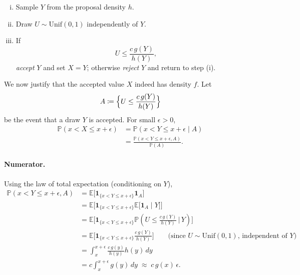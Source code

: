 \documentclass{tufte-handout}
\newcommand*\E{\mathbb{E}}
\renewcommand{\P}{\mathbb{P}}
\theoremstyle{definition}
\begin{document}
\begin{enumerate}[(i)]
	\item Sample $Y$ from the proposal density $h$.
	\item Draw $U \sim \mathrm{Unif}(0,1)$ independently of $Y$.
	\item If 
	      \[
	      	U \le \frac{c\,g(Y)}{h(Y)},
	      \]
	      \emph{accept} $Y$ and set $X = Y$; otherwise \emph{reject} $Y$
	      and return to step (i).
\end{enumerate}

We now justify that the accepted value $X$ indeed has density $f$.  Let
\[
	A \coloneqq \Bigl\{ U \le \frac{c\,g(Y)}{h(Y)} \Bigr\}
\]
be the event that a draw $Y$ is accepted.  For small $\epsilon>0$,
\begin{align*}
	\P(x < X \le x+\epsilon)
	&= \P(x < Y \le x+\epsilon \mid A) \\
	&= \frac{\P(x < Y \le x+\epsilon, A)}{\P(A)}.
\end{align*}

\paragraph{Numerator.}
Using the law of total expectation (conditioning on $Y$),
\begin{align*}
	\P(x < Y \le x+\epsilon, A)
	&= \E\bigl[ \mathbf 1_{\{x<Y\le x+\epsilon\}} \mathbf 1_A \bigr] \\
	&= \E\bigl[ \mathbf 1_{\{x<Y\le x+\epsilon\}}
		\E\bigl[ \mathbf 1_A \mid Y \bigr] \bigr] \\
	&= \E\biggl[ \mathbf 1_{\{x<Y\le x+\epsilon\}}
		\P\!\left( U \le \frac{c\,g(Y)}{h(Y)} \,\Big|\, Y \right) \biggr] \\
	&= \E\biggl[ \mathbf 1_{\{x<Y\le x+\epsilon\}}
		\frac{c\,g(Y)}{h(Y)} \biggr]
		\qquad \text{(since $U \sim \mathrm{Unif}(0,1)$, independent of $Y$)} \\
	&= \int_{x}^{x+\epsilon} \frac{c\,g(y)}{h(y)} h(y)\,dy \\
	&= c \int_{x}^{x+\epsilon} g(y)\,dy
	\;\approx\; c\,g(x)\,\epsilon.
\end{align*}
\end{document}
